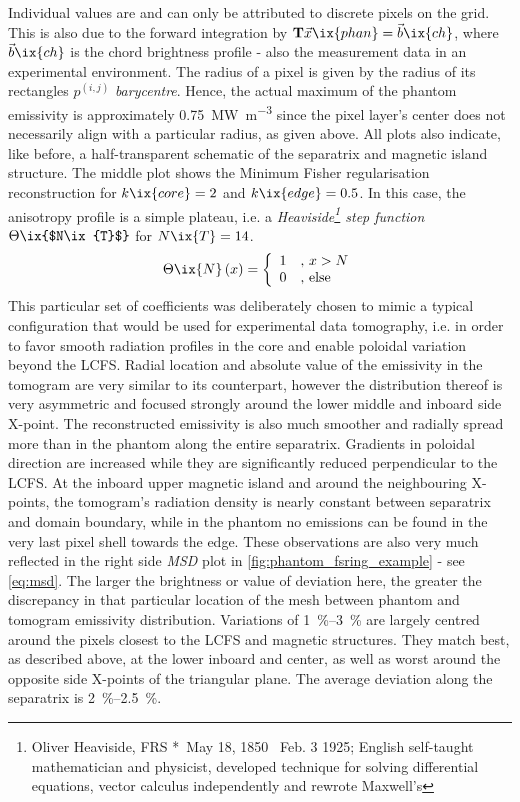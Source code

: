             Individual values are and can only be attributed to discrete pixels on the grid. This is also due to the forward integration by $\mathbf{T}\vec{x}\ix{phan}=\vec{b}\ix{ch}$, where $\vec{b}\ix{ch}$ is the chord brightness profile - also the measurement data in an experimental environment. The radius of a pixel is given by the radius of its rectangles $p^{\left(i,j\right)}$ \textit{barycentre}. Hence, the actual maximum of the phantom emissivity is approximately \SI{0.75}{\mega\watt\per\cubic\meter} since the pixel layer's center does not necessarily align with a particular radius, as given above. All plots also indicate, like before, a half-transparent schematic of the separatrix and magnetic island structure. The middle plot shows the Minimum Fisher regularisation reconstruction for $k\ix{core}=2$ and $k\ix{edge}=0.5$. In this case, the anisotropy profile is a simple plateau, i.e. a \textit{Heaviside\footnote[1]{Oliver Heaviside, FRS *~May 18, 1850 \textdagger~Feb. 3 1925; English self-taught mathematician and physicist, developed technique for solving differential equations, vector calculus independently and rewrote Maxwell's} step function} $\Theta\ix{$N\ix{T}$}$ for $N\ix{T}=14$.%
%
            \begin{align}%
                \Theta\ix{N}\left(x\right)=\left\{\begin{array}{ll}%
                    1&,\,x>N\\%
                    0&,\,\text{else}%
                \end{array}\right.\nonumber%
            \end{align}%
%
            This particular set of coefficients was deliberately chosen to mimic a typical configuration that would be used for experimental data tomography, i.e. in order to favor smooth radiation profiles in the core and enable poloidal variation beyond the LCFS. Radial location and absolute value of the emissivity in the tomogram are very similar to its counterpart, however the distribution thereof is very asymmetric and focused strongly around the lower middle and inboard side X-point. The reconstructed emissivity is also much smoother and radially spread more than in the phantom along the entire separatrix. Gradients in poloidal direction are increased while they are significantly reduced perpendicular to the LCFS. At the inboard upper magnetic island and around the neighbouring X-points, the tomogram's radiation density is nearly constant between separatrix and domain boundary, while in the phantom no emissions can be found in the very last pixel shell towards the edge. These observations are also very much reflected in the right side \textit{MSD} plot in \cref{fig:phantom_fsring_example} - see \cref{eq:msd}. The larger the brightness or value of deviation here, the greater the discrepancy in that particular location of the mesh between phantom and tomogram emissivity distribution. Variations of \SIrange{1}{3}{\percent} are largely centred around the pixels closest to the LCFS and magnetic structures. They match best, as described above, at the lower inboard and center, as well as worst around the opposite side X-points of the triangular plane. The average deviation along the separatrix is \SIrange{2}{2.5}{\percent}.\\%
